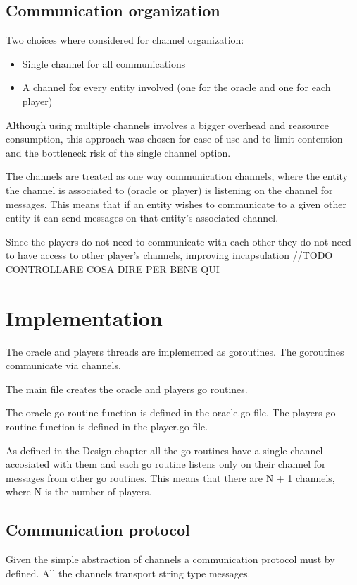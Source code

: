 \documentclass[12pt, a4paper]{report}
\begin{document}
\section{Communication organization}
Two choices where considered for channel organization:
\begin{itemize}
    \item Single channel for all communications
    \item A channel for every entity involved (one for the oracle and one for each player)
\end{itemize}

\newpage

Although using multiple channels involves a bigger overhead and reasource consumption, this approach was chosen for ease of use and to limit contention and
 the bottleneck risk of the single channel option.

The channels are treated as one way communication channels, where the entity the channel is associated to (oracle or player) is listening on the channel for messages.
 This means that if an entity wishes to communicate to a given other entity it can send messages on that entity's associated channel.

Since the players do not need to communicate with each other they do not need to have access to other player's channels, improving incapsulation //TODO CONTROLLARE COSA DIRE PER BENE QUI
\chapter{Implementation}
The oracle and players threads are implemented as goroutines. The goroutines communicate via channels.

The main file creates the oracle and players go routines.

The oracle go routine function is defined in the oracle.go file. The players go routine function is defined in the player.go file.

As defined in the Design chapter all the go routines have a single channel accosiated with them and each go routine listens only on their channel for messages from
 other go routines. This means that there are N + 1 channels, where N is the number of players.

\section{Communication protocol}
Given the simple abstraction of channels a communication protocol must by defined. All the channels transport string type messages.
\end{document}

